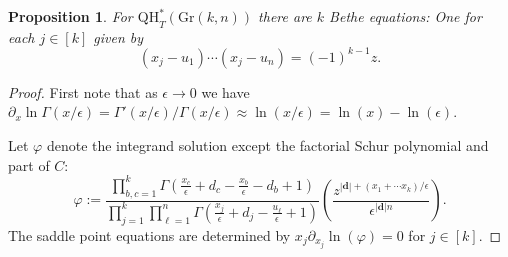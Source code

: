 \documentclass[12pt]{article}
\newtheorem{proposition}[theorem]{Proposition}
\theoremstyle{plain}
\theoremstyle{definition}
\newcommand{\db}{\boldsymbol{d}}
\begin{document}
\begin{proposition}
    For $\mathrm{QH}^*_T(\mathrm{Gr}(k,n))$ there are $k$ Bethe equations: One for each $j\in [k]$ given by
    $$
    (x_j-u_1)\cdots (x_j-u_n) = (-1)^{k-1}z.
    $$
\end{proposition}

\begin{proof}
First note that as $\epsilon \to 0$ we have $\partial_x \ln \Gamma(x/\epsilon)= \Gamma'(x/\epsilon)/\Gamma(x/\epsilon) \approx \ln(x/\epsilon)=\ln(x)-\ln(\epsilon)$.

Let $\varphi$ denote the integrand solution except the factorial Schur polynomial and part of $C$:
$$\varphi :=\frac{\prod_{b,c=1} ^k {\Gamma \left(\frac{x_c}{\epsilon}+d_c - \frac{x_b}{\epsilon} - d_b+1 \right)}  }{\prod_{j=1} ^k  \prod_{\ell=1} ^n \Gamma \left(\frac{x_j}{\epsilon}+d_j- \frac{u_\ell}{\epsilon}+1\right)}\left(\frac{ z^{|\db|+(x_1+\cdots x_k)/\epsilon} }{\epsilon^{|\db| n}}\right). $$ The saddle point equations are determined by $x_j\partial_{x_j} \ln (\varphi)=0$ for $j\in [k]$.


\end{proof}
\end{document}
